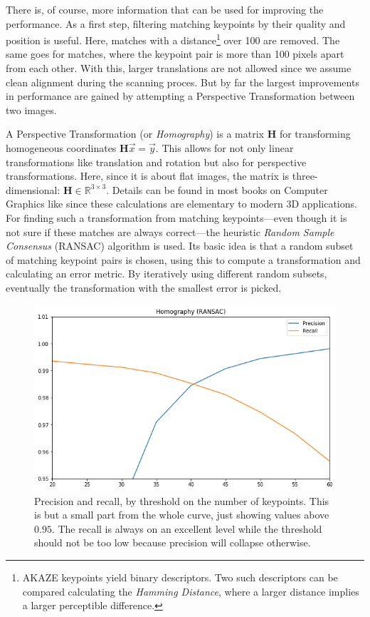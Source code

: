 \documentclass{ltjarticle}
\begin{document}
There is, of course, more information that can be used for improving the performance. As a first step, filtering matching keypoints by their quality and position is useful. Here, matches with a distance\footnote{AKAZE keypoints yield binary descriptors. Two such descriptors can be compared calculating the \emph{Hamming Distance}, where a larger distance implies a larger perceptible difference.} over 100 are removed. The same goes for matches, where the keypoint pair is more than 100 pixels apart from each other. With this, larger translations are not allowed since we assume clean alignment during the scanning proces. But by far the largest improvements in performance are gained by attempting a Perspective Transformation between two images.

A Perspective Transformation (or \emph{Homography}) is a matrix $\mathbf{H}$ for transforming homogeneous coordinates $\mathbf{H}\vec{x} = \vec{y}$. This allows for not only linear transformations like translation and rotation but also for perspective transformations. Here, since it is about flat images, the matrix is three-dimensional: $\mathbf{H} \in \mathbb{R}^{3 \times 3}$. Details can be found in most books on Computer Graphics like \cite{marschner2015fundamentals} since these calculations are elementary to modern 3D applications. For finding such a transformation from matching keypoints---even though it is not sure if these matches are always correct---the heuristic \emph{Random Sample Consensus} (RANSAC) algorithm is used.\cite{fischler1981random} Its basic idea is that a random subset of matching keypoint pairs is chosen, using this to compute a transformation and calculating an error metric. By iteratively using different random subsets, eventually the transformation with the smallest error is picked. 

\begin{figure}
    \centering
    \includegraphics[width=\linewidth]{ransac-performance.png}
    \caption[RANSAC performance]{Precision and recall, by threshold on the number of keypoints. This is but a small part from the whole curve, just showing values above $0.95$. The recall is always on an excellent level while the threshold should not be too low because precision will collapse otherwise.}
    \label{fig:ransac}
\end{figure}
\end{document}
